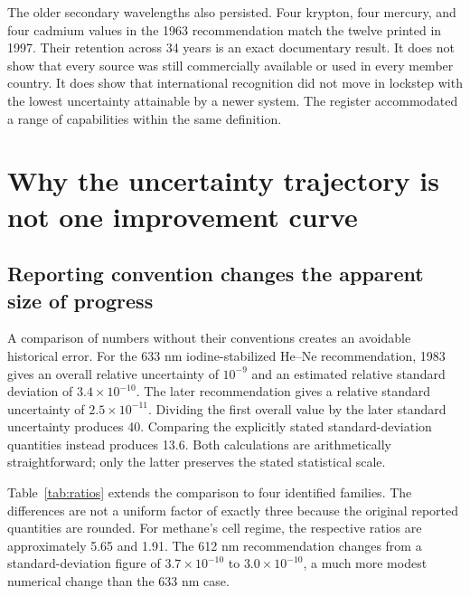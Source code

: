 \documentclass[11pt,a4paper]{article}
\begin{document}
The older secondary wavelengths also persisted. Four krypton, four mercury, and four cadmium values in the 1963 recommendation match the twelve printed in 1997. Their retention across 34 years is an exact documentary result. It does not show that every source was still commercially available or used in every member country. It does show that international recognition did not move in lockstep with the lowest uncertainty attainable by a newer system. The register accommodated a range of capabilities within the same definition.

\section{Why the uncertainty trajectory is not one improvement curve}
\subsection{Reporting convention changes the apparent size of progress}
A comparison of numbers without their conventions creates an avoidable historical error. For the 633 nm iodine-stabilized He--Ne recommendation, 1983 gives an overall relative uncertainty of $10^{-9}$ and an estimated relative standard deviation of $3.4\times10^{-10}$. The later recommendation gives a relative standard uncertainty of $2.5\times10^{-11}$. Dividing the first overall value by the later standard uncertainty produces 40. Comparing the explicitly stated standard-deviation quantities instead produces 13.6. Both calculations are arithmetically straightforward; only the latter preserves the stated statistical scale.

Table~\ref{tab:ratios} extends the comparison to four identified families. The differences are not a uniform factor of exactly three because the original reported quantities are rounded. For methane's cell regime, the respective ratios are approximately 5.65 and 1.91. The 612 nm recommendation changes from a standard-deviation figure of $3.7\times10^{-10}$ to $3.0\times10^{-10}$, a much more modest numerical change than the 633 nm case.
\end{document}
